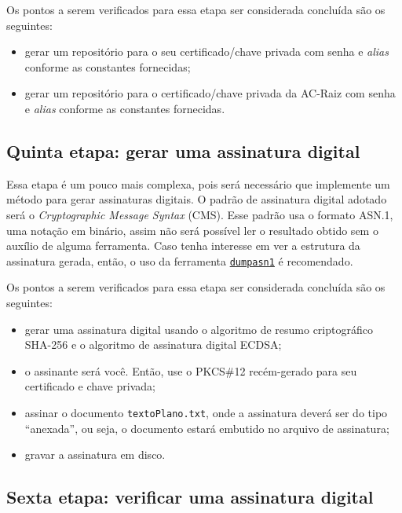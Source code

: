 \documentclass{article}
\begin{document}
Os pontos a serem verificados para essa etapa ser considerada concluída são os
seguintes:

\begin{itemize}
  \item gerar um repositório para o seu certificado/chave privada com senha
      e \textit{alias} conforme as constantes fornecidas;

  \item gerar um repositório para o certificado/chave privada da AC-Raiz com
      senha e \textit{alias} conforme as constantes fornecidas.
\end{itemize}

\subsection{Quinta etapa: gerar uma assinatura digital}\label{subsec:step5}

Essa etapa é um pouco mais complexa, pois será necessário que implemente um
método para gerar assinaturas digitais. O padrão de assinatura digital adotado
será o \textit{Cryptographic Message Syntax} (CMS). Esse padrão usa o formato
ASN.1, uma notação em binário, assim não será possível ler o resultado obtido
sem o auxílio de alguma ferramenta. Caso tenha interesse em ver a estrutura da
assinatura gerada, então, o uso da ferramenta
\texttt{\href{https://www.cs.auckland.ac.nz/~pgut001/dumpasn1.c}{dumpasn1}}
é recomendado.

Os pontos a serem verificados para essa etapa ser considerada concluída são os
seguintes:

\begin{itemize}
  \item gerar uma assinatura digital usando o algoritmo de resumo criptográfico
      SHA-256 e o algoritmo de assinatura digital ECDSA\@;

  \item o assinante será você. Então, use o PKCS\#12 recém-gerado para seu
      certificado e chave privada;

  \item assinar o documento \texttt{textoPlano.txt}, onde a assinatura deverá
      ser do tipo ``anexada'', ou seja, o documento estará embutido no arquivo
        de assinatura;

  \item gravar a assinatura em disco.
\end{itemize}

\subsection{Sexta etapa: verificar uma assinatura digital}\label{subsec:step6}
\end{document}
